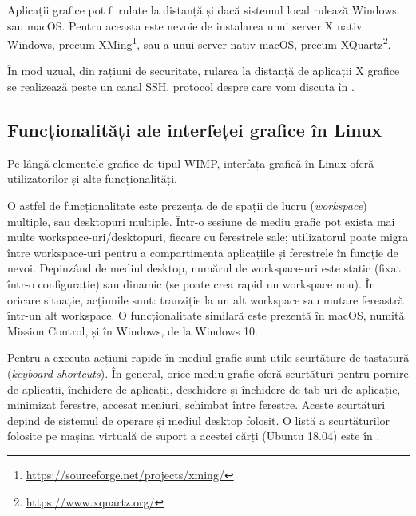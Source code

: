 Aplicații grafice pot fi rulate la distanță și dacă sistemul local rulează Windows sau macOS.
Pentru aceasta este nevoie de instalarea unui server X nativ Windows, precum XMing\footnote{\url{https://sourceforge.net/projects/xming/}}, sau a unui server nativ macOS, precum XQuartz\footnote{\url{https://www.xquartz.org/}}.

În mod uzual, din rațiuni de securitate, rularea la distanță de aplicații X grafice se realizează peste un canal SSH, protocol despre care vom discuta în .

\subsection{Funcționalități ale interfeței grafice în Linux}
\label{sec:ui:linux-gui-features}

Pe lângă elementele grafice de tipul WIMP, interfața grafică în Linux oferă utilizatorilor și alte funcționalități.

O astfel de funcționalitate este prezența de de spații de lucru (\textit{workspace}) multiple, sau desktopuri multiple.
Într-o sesiune de mediu grafic pot exista mai multe workspace-uri/desktopuri, fiecare cu ferestrele sale;
utilizatorul poate migra între workspace-uri pentru a compartimenta aplicațiile și ferestrele în funcție de nevoi.
Depinzând de mediul desktop, numărul de workspace-uri este static (fixat într-o configurație) sau dinamic (se poate crea rapid un workspace nou).
În oricare situație, acțiunile sunt: tranziție la un alt workspace sau mutare fereastră într-un alt workspace.
O funcționalitate similară este prezentă în macOS, numită Mission Control, și în Windows, de la Windows 10.

Pentru a executa acțiuni rapide în mediul grafic sunt utile scurtăture de tastatură (\textit{keyboard shortcuts}).
În general, orice mediu grafic oferă scurtături pentru pornire de aplicații, închidere de aplicații, deschidere și închidere de tab-uri de aplicație, minimizat ferestre, accesat meniuri, schimbat între ferestre.
Aceste scurtături depind de sistemul de operare și mediul desktop folosit.
O listă a scurtăturilor folosite pe mașina virtuală de suport a acestei cărți (Ubuntu 18.04) este în .

